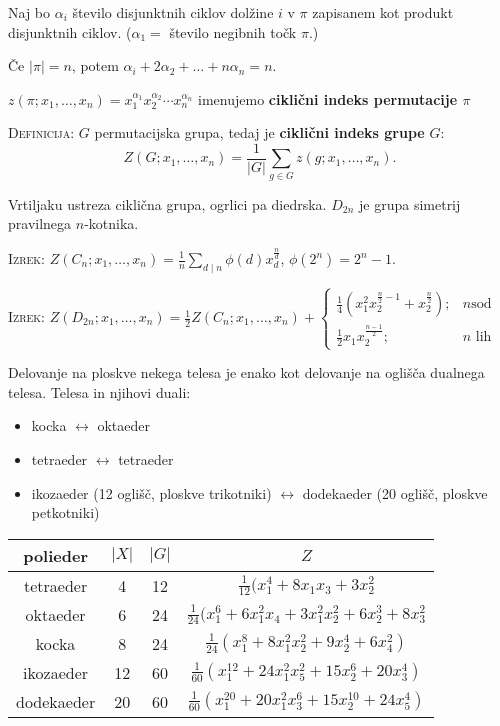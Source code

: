 \documentclass[8pt,a4paper]{amsart}
\theoremstyle{definition} %
\theoremstyle{plain} %
\begin{document}
Naj bo $\alpha_i$ število disjunktnih ciklov dolžine $i$ v $\pi$ zapisanem kot
produkt disjunktnih ciklov. ($\alpha_1 = $ število negibnih točk $\pi$.)

Če $|\pi| = n$, potem $\alpha_i + 2\alpha_2 + \ldots + n\alpha_n= n$.

$z(\pi ; x_1,\ldots ,x_n)=x_1^{\alpha_1}x_2^{\alpha_2}\cdots x_n^{\alpha_n}$
imenujemo \textbf{ciklični indeks permutacije $\pi$}

\textsc{Definicija:} $G$ permutacijska grupa, tedaj je \textbf{ciklični indeks
grupe} $G$:
$$ Z(G;x_1,\ldots ,x_n) = \frac{1}{|G|} \sum_{g\in G} z(g;x_1,\ldots ,x_n).$$

Vrtiljaku ustreza ciklična grupa, ogrlici pa diedrska. $D_{2n}$ je grupa
simetrij pravilnega $n$-kotnika.

\textsc{Izrek:} $Z(C_n; x_1,\ldots, x_n) = \frac{1}{n} \displaystyle \sum_{d
\mid n} \phi
(d)x_d^{\frac{n}{d}}$, \quad $\phi(2^n) = 2^n-1$.

\textsc{Izrek:} $Z(D_{2n}; x_1,\ldots,x_n) = \frac{1}{2} Z(C_n;x_1,\ldots,x_n) +
\begin{cases} \frac{1}{4}(x_1^2x_2^{\frac{n}{2}-1}+x_2^{\frac{n}{2}});& n \text{
  sod} \\ \frac{1}{2}x_1x_2^{\frac{n-1}{2}};& n \text{ lih} \end{cases}$

Delovanje na ploskve nekega telesa je enako kot delovanje na oglišča dualnega
telesa. Telesa in njihovi duali:
\begin{itemize}
  \item kocka $\leftrightarrow$ oktaeder
  \item tetraeder $\leftrightarrow$ tetraeder
  \item ikozaeder (12 oglišč, ploskve trikotniki) $\leftrightarrow$ dodekaeder (20
    oglišč, ploskve petkotniki)
\end{itemize}

\begin{tabular}{| c || c | c | c |}\hline
  polieder & $|X|$ & $|G|$ & $Z$ \\ \hline\hline
  tetraeder & 4 & 12 & $\frac{1}{12}(x_1^4+8x_1x_3 + 3x_2^2$\\ \hline
  oktaeder & 6 & 24 & $\frac{1}{24}(x_1^6+6x_1^2x_4 + 3x_1^2x_2^2+6x_2^3+8x_3^2$\\ \hline
  kocka & 8 & 24 & $\frac{1}{24}(x_1^8+8x_1^2x_2^2 + 9x_2^4 + 6x_4^2)$ \\ \hline
  ikozaeder & 12 & 60 & $\frac{1}{60}(x_1^{12} + 24x_1^2x_5^2 + 15x_2^6 + 20x_3^4)$ \\ \hline
  dodekaeder & 20 & 60 & $\frac{1}{60}(x_1^{20} + 20x_1^2x_3^6 + 15x_2^{10} + 24x_5^4)$ \\ \hline
\end{tabular}
\end{document}
